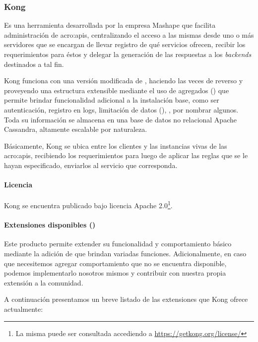 \subsubsection{Kong}
\label{soa:tecnologias:kong}

Es una herramienta desarrollada por la empresa Mashape que facilita administración de \glspl{acro:api}, centralizando el acceso a las mismas desde uno o más servidores que se encargan de llevar registro de qué servicios ofrecen, recibir los requerimientos para éstos y delegar la generación de las respuestas a los \textit{backends} destinados a tal fin.

Kong funciona con una versión modificada de , haciendo las veces de  reverso y proveyendo una estructura extensible mediante el uso de agregados () que permite brindar funcionalidad adicional a la instalación base, como ser autenticación, registro en logs, limitación de datos (), , por nombrar algunos. Toda su información se almacena en una base de datos no relacional Apache Cassandra, altamente escalable por naturaleza.

Básicamente, Kong se ubica entre los clientes y las instancias vivas de las \glspl{acro:api}, recibiendo los requerimientos para luego de aplicar las reglas que se le hayan especificado, enviarlos al servicio que corresponda.

\paragraph{Licencia}

Kong se encuentra publicado bajo licencia Apache 2.0\footnote{La misma puede ser consultada accediendo a \url{https://getkong.org/license/}}.

\paragraph{Extensiones disponibles ()}

Este producto permite extender su funcionalidad y comportamiento básico mediante la adición de  que brindan variadas funciones. Adicionalmente, en caso que necesitemos agregar comportamiento que no se encuentra disponible, podemos implementarlo nosotros mismos y contribuir con nuestra propia extensión a la comunidad.

A continuación presentamos un breve listado de las extensiones que Kong ofrece actualmente:

